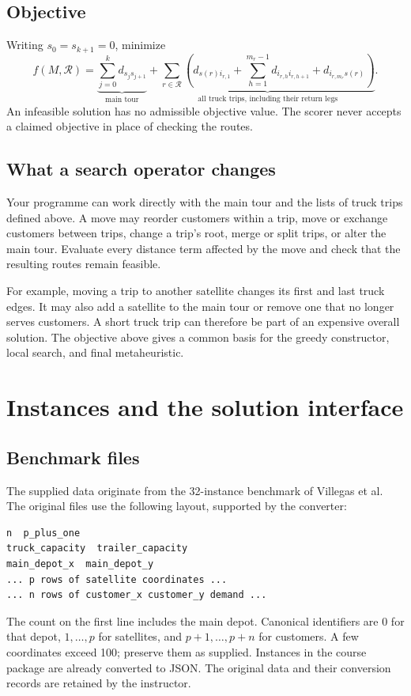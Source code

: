 \documentclass[11pt,a4paper]{article}
\newcommand{\R}{\mathcal R}\newcommand{\C}{\mathcal C}\newcommand{\Sats}{\mathcal S}
\begin{document}
\subsection{Objective}
Writing $s_0=s_{k+1}=0$, minimize
\[
f(M,\R)=\underbrace{\sum_{j=0}^{k}d_{s_js_{j+1}}}_{\text{main tour}}
+\underbrace{\sum_{r\in\R}\left(d_{s(r)i_{r,1}}+
\sum_{h=1}^{m_r-1}d_{i_{r,h}i_{r,h+1}}+d_{i_{r,m_r}s(r)}\right)}_{\text{all truck trips, including their return legs}}.
\]
An infeasible solution has no admissible objective value. The scorer never accepts a claimed objective in place of checking the routes.

\subsection{What a search operator changes}
Your programme can work directly with the main tour and the lists of truck trips defined above. A move may reorder customers within a trip, move or exchange customers between trips, change a trip's root, merge or split trips, or alter the main tour. Evaluate every distance term affected by the move and check that the resulting routes remain feasible.

For example, moving a trip to another satellite changes its first and last truck edges. It may also add a satellite to the main tour or remove one that no longer serves customers. A short truck trip can therefore be part of an expensive overall solution. The objective above gives a common basis for the greedy constructor, local search, and final metaheuristic.


\section{Instances and the solution interface}
\subsection{Benchmark files}
The supplied data originate from the 32-instance benchmark of Villegas et al. The original files use the following layout, supported by the converter:
\begin{lstlisting}
n  p_plus_one
truck_capacity  trailer_capacity
main_depot_x  main_depot_y
... p rows of satellite coordinates ...
... n rows of customer_x customer_y demand ...
\end{lstlisting}
The count on the first line includes the main depot. Canonical identifiers are $0$ for that depot, $1,\ldots,p$ for satellites, and $p+1,\ldots,p+n$ for customers. A few coordinates exceed 100; preserve them as supplied. Instances in the course package are already converted to JSON. The original data and their conversion records are retained by the instructor.
\end{document}
